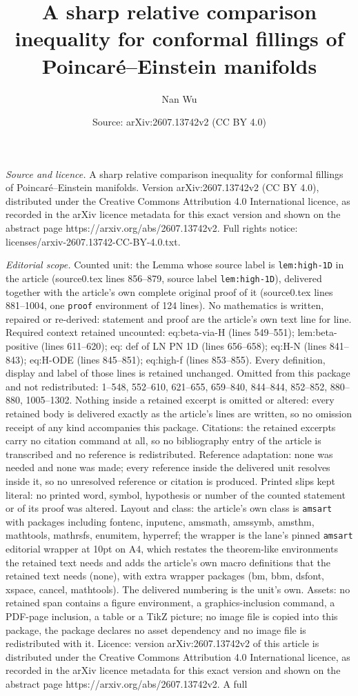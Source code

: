 \documentclass[10pt,a4paper]{amsart}
\title[A sharp relative comparison inequality for conformal filling]{A sharp relative comparison inequality for conformal fillings of Poincar\'e--Einstein manifolds}
\author{Nan Wu}
\date{Source: arXiv:2607.13742v2 (CC BY 4.0)}
\begin{document}
\maketitle

\noindent\emph{Source and licence.} A sharp relative comparison inequality for conformal fillings of Poincar\'e--Einstein manifolds. Version arXiv:2607.13742v2 (CC BY 4.0), distributed under the Creative Commons Attribution 4.0 International licence, as recorded in the arXiv licence metadata for this exact version and shown on the abstract page https://arxiv.org/abs/2607.13742v2. Full rights notice: licenses/arxiv-2607.13742-CC-BY-4.0.txt.\par\smallskip

\noindent\textit{Editorial scope.} Counted unit: the Lemma whose source label is \texttt{lem:high-1D} in the article (source0.tex lines 856--879, source label \texttt{lem:high-1D}), delivered together with the article's own complete original proof of it (source0.tex lines 881--1004, one \texttt{proof} environment of 124 lines). No mathematics is written, repaired or re-derived: statement and proof are the article's own text line for line. Required context retained uncounted: eq:beta-via-H (lines 549--551); lem:beta-positive (lines 611--620); eq: def of LN PN 1D (lines 656--658); eq:H-N (lines 841--843); eq:H-ODE (lines 845--851); eq:high-f (lines 853--855). Every definition, display and label of those lines is retained unchanged. Omitted from this package and not redistributed: 1--548, 552--610, 621--655, 659--840, 844--844, 852--852, 880--880, 1005--1302. Nothing inside a retained excerpt is omitted or altered: every retained body is delivered exactly as the article's lines are written, so no omission receipt of any kind accompanies this package. Citations: the retained excerpts carry no citation command at all, so no bibliography entry of the article is transcribed and no reference is redistributed. Reference adaptation: none was needed and none was made; every reference inside the delivered unit resolves inside it, so no unresolved reference or citation is produced. Printed slips kept literal: no printed word, symbol, hypothesis or number of the counted statement or of its proof was altered. Layout and class: the article's own class is \texttt{amsart} with packages including fontenc, inputenc, amsmath, amssymb, amsthm, mathtools, mathrsfs, enumitem, hyperref; the wrapper is the lane's pinned \texttt{amsart} editorial wrapper at 10pt on A4, which restates the theorem-like environments the retained text needs and adds the article's own macro definitions that the retained text needs (none), with extra wrapper packages (bm, bbm, dsfont, xspace, cancel, mathtools). The delivered numbering is the unit's own. Assets: no retained span contains a figure environment, a graphics-inclusion command, a PDF-page inclusion, a table or a TikZ picture; no image file is copied into this package, the package declares no asset dependency and no image file is redistributed with it. Licence: version arXiv:2607.13742v2 of this article is distributed under the Creative Commons Attribution 4.0 International licence, as recorded in the arXiv licence metadata for this exact version and shown on the abstract page https://arxiv.org/abs/2607.13742v2. A full 
\end{document}
